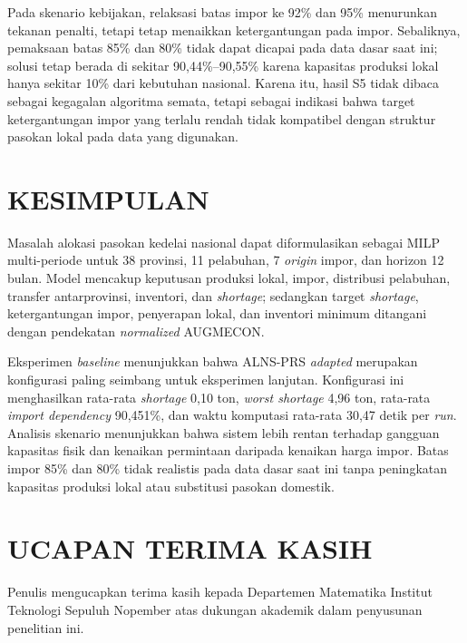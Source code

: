 \documentclass[journal]{IEEEtran}
\theoremstyle{definition}
\theoremstyle{definition}
\theoremstyle{plain}
\begin{document}
    Pada skenario kebijakan, relaksasi batas impor ke 92\% dan 95\% menurunkan tekanan penalti, tetapi tetap menaikkan ketergantungan pada impor. Sebaliknya, pemaksaan batas 85\% dan 80\% tidak dapat dicapai pada data dasar saat ini; solusi tetap berada di sekitar 90,44\%--90,55\% karena kapasitas produksi lokal hanya sekitar 10\% dari kebutuhan nasional. Karena itu, hasil S5 tidak dibaca sebagai kegagalan algoritma semata, tetapi sebagai indikasi bahwa target ketergantungan impor yang terlalu rendah tidak kompatibel dengan struktur pasokan lokal pada data yang digunakan.

    \section{KESIMPULAN}
    Masalah alokasi pasokan kedelai nasional dapat diformulasikan sebagai MILP multi-periode untuk 38 provinsi, 11 pelabuhan, 7 \textit{origin} impor, dan horizon 12 bulan. Model mencakup keputusan produksi lokal, impor, distribusi pelabuhan, transfer antarprovinsi, inventori, dan \textit{shortage}; sedangkan target \textit{shortage}, ketergantungan impor, penyerapan lokal, dan inventori minimum ditangani dengan pendekatan \textit{normalized} AUGMECON.

    Eksperimen \textit{baseline} menunjukkan bahwa ALNS-PRS \textit{adapted} merupakan konfigurasi paling seimbang untuk eksperimen lanjutan. Konfigurasi ini menghasilkan rata-rata \textit{shortage} 0,10 ton, \textit{worst shortage} 4,96 ton, rata-rata \textit{import dependency} 90,451\%, dan waktu komputasi rata-rata 30,47 detik per \textit{run}. Analisis skenario menunjukkan bahwa sistem lebih rentan terhadap gangguan kapasitas fisik dan kenaikan permintaan daripada kenaikan harga impor. Batas impor 85\% dan 80\% tidak realistis pada data dasar saat ini tanpa peningkatan kapasitas produksi lokal atau substitusi pasokan domestik.

    \section*{UCAPAN TERIMA KASIH}
    Penulis mengucapkan terima kasih kepada Departemen Matematika Institut Teknologi Sepuluh Nopember atas dukungan akademik dalam penyusunan penelitian ini.
\end{document}
